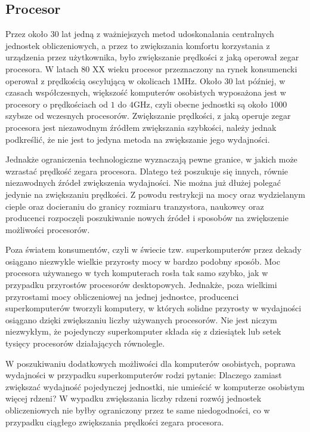 \subsection{Procesor}\label{03-procesor}
Przez około 30 lat jedną z ważniejszych metod udoskonalania centralnych jednostek obliczeniowych, a przez to zwiększania komfortu korzystania z urządzenia przez użytkownika, było zwiększanie prędkości z jaką operował zegar procesora. W latach 80 XX wieku procesor przeznaczony na rynek konsumencki operował z prędkością oscylującą w okolicach $1$MHz. Około 30 lat później, w czasach współczesnych, większość komputerów osobistych wyposażona jest w procesory o prędkościach od $1$ do $4$GHz, czyli obecne jednostki są około $1000$ szybsze od wczesnych procesorów. Zwiększanie prędkości, z jaką operuje zegar procesora jest niezawodnym źródłem zwiększania szybkości, należy jednak podkreślić, że nie jest to jedyna metoda na zwiększanie jego wydajności.

Jednakże ograniczenia technologiczne wyznaczają pewne granice, w jakich może wzrastać prędkość zegara procesora. Dlatego też poszukuje się innych, równie niezawodnych źródeł zwiększenia wydajności. Nie można już dłużej polegać jedynie na zwiększaniu prędkości. Z powodu restrykcji na mocy oraz wydzielanym cieple oraz docieraniu do granicy rozmiaru tranzystora, naukowcy oraz producenci rozpoczęli poszukiwanie nowych źródeł i sposobów na zwiększenie możliwości procesorów.

Poza światem konsumentów, czyli w świecie tzw. superkomputerów przez dekady osiągano niezwykle wielkie przyrosty mocy w bardzo podobny sposób. Moc procesora używanego w tych komputerach rosła tak samo szybko, jak w przypadku przyrostów procesorów desktopowych. Jednakże, poza wielkimi przyrostami mocy obliczeniowej na jednej jednostce, producenci superkomputerów tworzyli komputery, w których solidne przyrosty w wydajności osiągano dzięki zwiększaniu liczby używanych procesorów. Nie jest niczym niezwykłym, że pojedynczy superkomputer składa się z dziesiątek lub setek tysięcy procesorów działających równolegle.

W poszukiwaniu dodatkowych możliwości dla komputerów osobistych, poprawa wydajności w przypadku superkomputerów rodzi pytanie: Dlaczego zamiast zwiększać wydajność pojedynczej jednostki, nie umieścić w komputerze osobistym więcej rdzeni? W wypadku zwiększania liczby rdzeni rozwój jednostek obliczeniowych nie byłby ograniczony przez te same niedogodności, co w przypadku ciągłego zwiększania prędkości zegara procesora.

